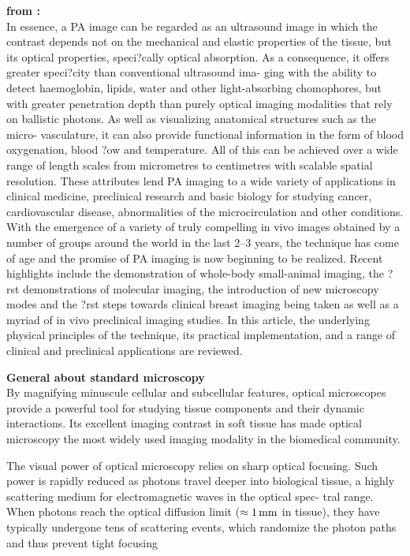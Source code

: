 \textbf{from \cite{2011_Beard_Biomedicalphotoacousticimaging.}:\\}
In essence, a PA image can be regarded as an ultrasound image in which the contrast depends not on the mechanical and elastic properties of the tissue, but its optical properties, speci?cally optical absorption. As a consequence, it offers greater speci?city than conventional ultrasound ima- ging with the ability to detect haemoglobin, lipids, water and other light-absorbing chomophores, but with greater penetration depth than purely optical imaging modalities that rely on ballistic photons. As well as visualizing anatomical structures such as the micro- vasculature, it can also provide functional information in the form of blood oxygenation, blood ?ow and temperature. All of this can be achieved over a wide range of length scales from micrometres to centimetres with scalable spatial resolution. These attributes lend PA imaging to a wide variety of applications in clinical medicine, preclinical research and basic biology for studying cancer, cardiovascular disease, abnormalities of the microcirculation and other conditions. With the emergence of a variety of truly compelling in vivo images obtained by a number of groups around the world in the last 2–3 years, the technique has come of age and the promise of PA imaging is now beginning to be realized. Recent highlights include the demonstration of whole-body small-animal imaging, the ?rst demonstrations of molecular imaging, the introduction of new microscopy modes and the ?rst steps towards clinical breast imaging being taken as well as a myriad of in vivo preclinical imaging studies. In this article, the underlying physical principles of the technique, its practical implementation, and a range of clinical and preclinical applications are reviewed.

\textbf{General about standard microscopy}\\
By magnifying minuscule cellular and subcellular features, optical microscopes provide a powerful tool for studying tissue components and their dynamic interactions. Its excellent imaging contrast in soft tissue has made optical microscopy the most widely used imaging modality in the biomedical community.\cite{2000_Amos_Lessonsfromhistory}  

The visual power of optical microscopy relies on sharp optical focusing. Such power is rapidly reduced as photons travel deeper into biological tissue, a highly scattering medium for electromagnetic waves in the optical spec- tral range. When photons reach the optical diffusion limit ($\approx \unit[1]{mm}$ in tissue), they have typically undergone tens of scattering events, which randomize the photon paths and thus prevent tight focusing~\cite{2000_Fujimoto_Opticalcoherencetomography:}

